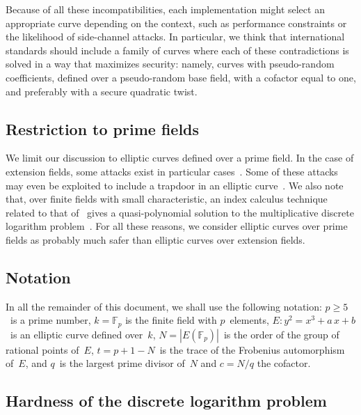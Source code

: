 \documentclass[twocolumn,letterpaper,10pt]{article}
\def\F{\mathbb{F}}
\def\abs#1{\left|#1\right|}
\def\XXX{{\colorbox{red}{{\color{white}\bfseries XXX}}}}
\begin{document}
\medskip

Because of all these incompatibilities,
each implementation might select an appropriate curve
depending on the context,
such as performance constraints or the likelihood of side-channel attacks.
In particular, we think that
international standards should include a family of curves
where each of these contradictions is solved in a way
that maximizes security:
namely, curves with pseudo-random coefficients,
defined over a pseudo-random base field,
with a cofactor equal to one, and preferably with a secure quadratic twist.

\subsection*{Restriction to prime fields}
We limit our discussion to elliptic curves defined over a prime field.
In the case of extension fields,
some attacks exist in particular
cases~\cite{jc2013jv,rsa2004mtw,asia1999dgm,jc2002ghs}.
Some of these attacks may even be exploited
to include a trapdoor in an elliptic curve~\cite{jc2006teske}.
We also note that, over finite fields with small characteristic,
an index calculus technique related to that of~\cite{jc2013jv}
gives a quasi-polynomial solution to
the multiplicative discrete logarithm problem~\cite{euro2014bgjt}.
For all these reasons, we consider elliptic curves over prime fields
as probably much safer than elliptic curves over extension fields.



\subsection*{Notation}
In all the remainder of this document,
we shall use the following notation:
$p ≥ 5$~is a prime number,
$k = \F_{p}$ is the finite field with $p$~elements,
$E: y^2 = x^3 + a\,x + b$~is an elliptic curve defined over~$k$,
$N = \abs{E(\F_p)}$~is the order of the group of rational points of~$E$,
$t = p + 1 - N$~is the trace of the Frobenius automorphism of~$E$,
and $q$~is the largest prime divisor of~$N$ and $c = N/q$ the cofactor.

\subsection{Hardness of the discrete logarithm problem}
\label{ss:dlp}
\end{document}
